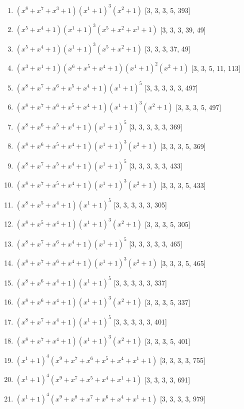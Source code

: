 \documentclass[10pt,twocolumn]{article}
\begin{document}
\begin{enumerate}
\item $(x^{8} + x^{7} + x^{3} + 1)(x^{1} + 1)^{3}(x^{2} + 1)$  [3, 3, 3, 5, 393]
\item $(x^{5} + x^{4} + 1)(x^{1} + 1)^{3}(x^{5} + x^{2} + x^{1} + 1)$  [3, 3, 3, 39, 49]
\item $(x^{5} + x^{4} + 1)(x^{1} + 1)^{3}(x^{5} + x^{2} + 1)$  [3, 3, 3, 37, 49]
\item $(x^{3} + x^{1} + 1)(x^{6} + x^{5} + x^{4} + 1)(x^{1} + 1)^{2}(x^{2} + 1)$  [3, 3, 5, 11, 113]
\item $(x^{8} + x^{7} + x^{6} + x^{5} + x^{4} + 1)(x^{1} + 1)^{5}$  [3, 3, 3, 3, 3, 497]
\item $(x^{8} + x^{7} + x^{6} + x^{5} + x^{4} + 1)(x^{1} + 1)^{3}(x^{2} + 1)$  [3, 3, 3, 5, 497]
\item $(x^{8} + x^{6} + x^{5} + x^{4} + 1)(x^{1} + 1)^{5}$  [3, 3, 3, 3, 3, 369]
\item $(x^{8} + x^{6} + x^{5} + x^{4} + 1)(x^{1} + 1)^{3}(x^{2} + 1)$  [3, 3, 3, 5, 369]
\item $(x^{8} + x^{7} + x^{5} + x^{4} + 1)(x^{1} + 1)^{5}$  [3, 3, 3, 3, 3, 433]
\item $(x^{8} + x^{7} + x^{5} + x^{4} + 1)(x^{1} + 1)^{3}(x^{2} + 1)$  [3, 3, 3, 5, 433]
\item $(x^{8} + x^{5} + x^{4} + 1)(x^{1} + 1)^{5}$  [3, 3, 3, 3, 3, 305]
\item $(x^{8} + x^{5} + x^{4} + 1)(x^{1} + 1)^{3}(x^{2} + 1)$  [3, 3, 3, 5, 305]
\item $(x^{8} + x^{7} + x^{6} + x^{4} + 1)(x^{1} + 1)^{5}$  [3, 3, 3, 3, 3, 465]
\item $(x^{8} + x^{7} + x^{6} + x^{4} + 1)(x^{1} + 1)^{3}(x^{2} + 1)$  [3, 3, 3, 5, 465]
\item $(x^{8} + x^{6} + x^{4} + 1)(x^{1} + 1)^{5}$  [3, 3, 3, 3, 3, 337]
\item $(x^{8} + x^{6} + x^{4} + 1)(x^{1} + 1)^{3}(x^{2} + 1)$  [3, 3, 3, 5, 337]
\item $(x^{8} + x^{7} + x^{4} + 1)(x^{1} + 1)^{5}$  [3, 3, 3, 3, 3, 401]
\item $(x^{8} + x^{7} + x^{4} + 1)(x^{1} + 1)^{3}(x^{2} + 1)$  [3, 3, 3, 5, 401]
\item $(x^{1} + 1)^{4}(x^{9} + x^{7} + x^{6} + x^{5} + x^{4} + x^{1} + 1)$  [3, 3, 3, 3, 755]
\item $(x^{1} + 1)^{4}(x^{9} + x^{7} + x^{5} + x^{4} + x^{1} + 1)$  [3, 3, 3, 3, 691]
\item $(x^{1} + 1)^{4}(x^{9} + x^{8} + x^{7} + x^{6} + x^{4} + x^{1} + 1)$  [3, 3, 3, 3, 979]

\end{enumerate}
\end{document}
